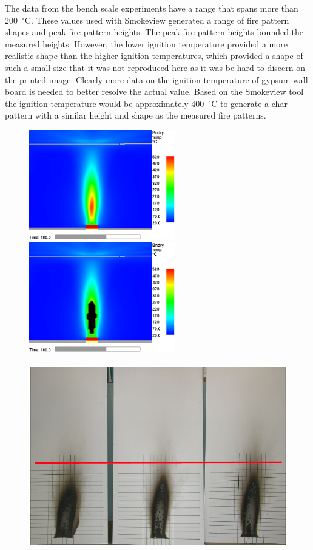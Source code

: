 \documentclass[twoside]{uocthesis}
\begin{document}
{The data from the bench scale experiments have a range that spans more than 200~$^\circ$C. These values used with Smokeview generated a range of fire pattern shapes and peak fire pattern heights.  The peak fire pattern heights bounded the measured heights. However, the lower ignition temperature provided a more realistic shape than the higher ignition temperatures, which provided a shape of such a small size that it was not reproduced here as it was be hard to discern on the printed image.  Clearly more data on the ignition temperature of gypsum wall board is needed to better resolve the actual value.  Based on the Smokeview tool the ignition temperature would be approximately 400~$^\circ$C to generate a char pattern with a similar height and shape as the measured fire patterns.

\begin{figure}[h]
  \centering
  \includegraphics[width=2.5in]{../Figures/WallTemp_10mm_0D_0_8m_guideline}
  \includegraphics[width=2.5in]{../Figures/350CThresholdwall_temp_0_8m_guideline}\\
  \hspace{4 mm}  \\ 
  \includegraphics[width=.625\columnwidth]{../Figures/GBNGreps_w_1m_guideline}\\

\end{figure}}
\end{document}
